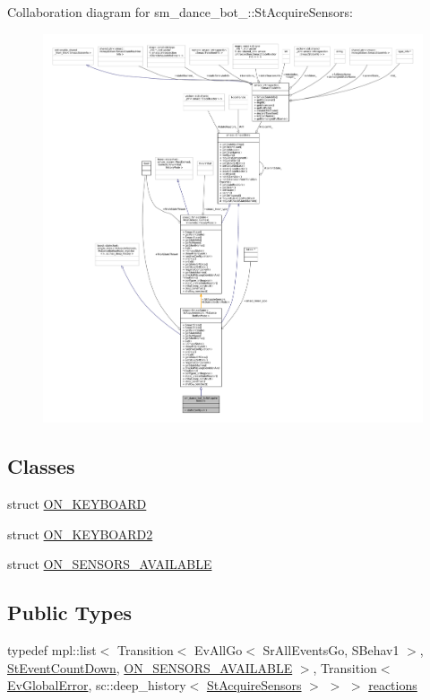 Collaboration diagram for sm\+\_\+dance\+\_\+bot\+\_\+:\+:St\+Acquire\+Sensors\+:
\nopagebreak
\begin{figure}[H]
\begin{center}
\leavevmode
\includegraphics[width=350pt]{structsm__dance__bot__3_1_1StAcquireSensors__coll__graph}
\end{center}
\end{figure}
\subsection*{Classes}
\begin{DoxyCompactItemize}
\item 
struct \hyperlink{structsm__dance__bot__3_1_1StAcquireSensors_1_1ON__KEYBOARD}{O\+N\+\_\+\+K\+E\+Y\+B\+O\+A\+RD}
\item 
struct \hyperlink{structsm__dance__bot__3_1_1StAcquireSensors_1_1ON__KEYBOARD2}{O\+N\+\_\+\+K\+E\+Y\+B\+O\+A\+R\+D2}
\item 
struct \hyperlink{structsm__dance__bot__3_1_1StAcquireSensors_1_1ON__SENSORS__AVAILABLE}{O\+N\+\_\+\+S\+E\+N\+S\+O\+R\+S\+\_\+\+A\+V\+A\+I\+L\+A\+B\+LE}
\end{DoxyCompactItemize}
\subsection*{Public Types}
\begin{DoxyCompactItemize}
\item 
typedef mpl\+::list$<$ Transition$<$ Ev\+All\+Go$<$ Sr\+All\+Events\+Go, S\+Behav1 $>$, \hyperlink{structsm__dance__bot__3_1_1StEventCountDown}{St\+Event\+Count\+Down}, \hyperlink{structsm__dance__bot__3_1_1StAcquireSensors_1_1ON__SENSORS__AVAILABLE}{O\+N\+\_\+\+S\+E\+N\+S\+O\+R\+S\+\_\+\+A\+V\+A\+I\+L\+A\+B\+LE} $>$, Transition$<$ \hyperlink{structsm__dance__bot__3_1_1EvGlobalError}{Ev\+Global\+Error}, sc\+::deep\+\_\+history$<$ \hyperlink{structsm__dance__bot__3_1_1StAcquireSensors}{St\+Acquire\+Sensors} $>$ $>$ $>$ \hyperlink{structsm__dance__bot__3_1_1StAcquireSensors_ad4a815f8be0ab389559c0d724896664e}{reactions}
\end{DoxyCompactItemize}
